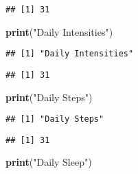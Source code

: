 \documentclass[
]{article}
\newenvironment{Shaded}{\begin{snugshade}}{\end{snugshade}}
\newcommand{\FunctionTok}[1]{\textcolor[rgb]{0.13,0.29,0.53}{\textbf{#1}}}
\newcommand{\NormalTok}[1]{#1}
\newcommand{\SpecialCharTok}[1]{\textcolor[rgb]{0.81,0.36,0.00}{\textbf{#1}}}
\newcommand{\StringTok}[1]{\textcolor[rgb]{0.31,0.60,0.02}{#1}}
\begin{document}
\begin{verbatim}
## [1] 31
\end{verbatim}

\begin{Shaded}
\begin{Highlighting}[]
\FunctionTok{print}\NormalTok{(}\StringTok{"Daily Intensities"}\NormalTok{)}
\end{Highlighting}
\end{Shaded}

\begin{verbatim}
## [1] "Daily Intensities"
\end{verbatim}

\begin{Shaded}
\end{Shaded}

\begin{verbatim}
## [1] 31
\end{verbatim}

\begin{Shaded}
\begin{Highlighting}[]
\FunctionTok{print}\NormalTok{(}\StringTok{"Daily Steps"}\NormalTok{)}
\end{Highlighting}
\end{Shaded}

\begin{verbatim}
## [1] "Daily Steps"
\end{verbatim}

\begin{Shaded}
\end{Shaded}

\begin{verbatim}
## [1] 31
\end{verbatim}

\begin{Shaded}
\begin{Highlighting}[]
\FunctionTok{print}\NormalTok{(}\StringTok{"Daily Sleep"}\NormalTok{)}
\end{Highlighting}
\end{Shaded}
\end{document}
